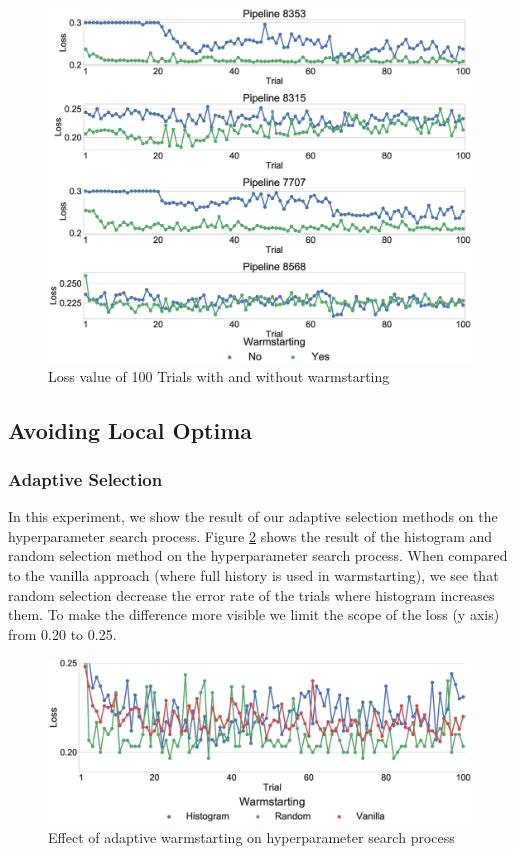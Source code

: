 \begin{figure}
\centering
\includegraphics[width=\columnwidth]{../images/experiment-results/task31-cold-warm-trials.eps}
\caption{Loss value of 100 Trials with and without warmstarting}
\label{fig-avg-warm-vs-cold-task-31}
\end{figure}

\subsection{Avoiding Local Optima}

\subsubsection{Adaptive Selection}
In this experiment, we show the result of our adaptive selection methods on the hyperparameter search process.
Figure \ref{fig-avg-adaptive-selection-task-31} shows the result of the histogram and random selection method on the hyperparameter search process.
When compared to the vanilla approach (where full history is used in warmstarting), we see that random selection decrease the error rate of the trials where histogram increases them.
To make the difference more visible we limit the scope of the loss (y axis) from 0.20 to 0.25.
\begin{figure}
\centering
\includegraphics[width=\columnwidth]{../images/experiment-results/t31-f7707-adaptive-method-random.eps}
\caption{Effect of adaptive warmstarting on hyperparameter search process}
\label{fig-avg-adaptive-selection-task-31}
\end{figure}

